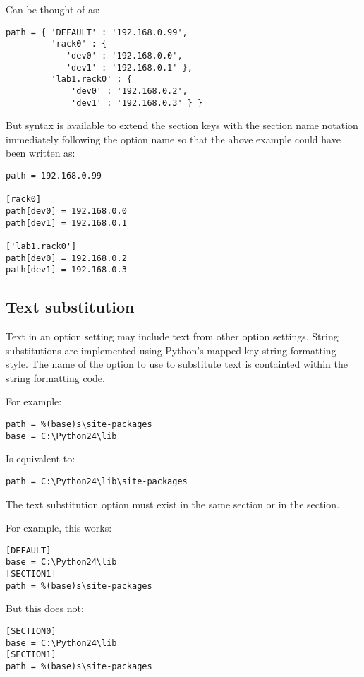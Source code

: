 \documentclass{howto}
\begin{document}
Can be thought of as:

\begin{verbatim}
path = { 'DEFAULT' : '192.168.0.99',
         'rack0' : {
            'dev0' : '192.168.0.0',
            'dev1' : '192.168.0.1' },
         'lab1.rack0' : {
             'dev0' : '192.168.0.2',
             'dev1' : '192.168.0.3' } }
\end{verbatim}

But syntax is available to extend the section keys with the section name
notation immediately following the option name so that the above example
could have been written as:

\begin{verbatim}
path = 192.168.0.99

[rack0]
path[dev0] = 192.168.0.0
path[dev1] = 192.168.0.1

['lab1.rack0']
path[dev0] = 192.168.0.2
path[dev1] = 192.168.0.3
\end{verbatim}

\subsection{Text substitution\label{cfgparse-text-sub}}
Text in an option setting may include text from other option settings.
String substitutions are implemented using Python's mapped key string
formatting style.  The name of the option to use to substitute text 
is containted within the string formatting code.

For example:
\begin{verbatim}
path = %(base)s\site-packages
base = C:\Python24\lib
\end{verbatim}

Is equivalent to:
\begin{verbatim}
path = C:\Python24\lib\site-packages
\end{verbatim}

The text substitution option must exist in the same section or in the 
\code{[DEFAULT]} section.  

For example, this works:
\begin{verbatim}
[DEFAULT]
base = C:\Python24\lib
[SECTION1]
path = %(base)s\site-packages
\end{verbatim}

But this does not:
\begin{verbatim}
[SECTION0]
base = C:\Python24\lib
[SECTION1]
path = %(base)s\site-packages
\end{verbatim}
\end{document}
